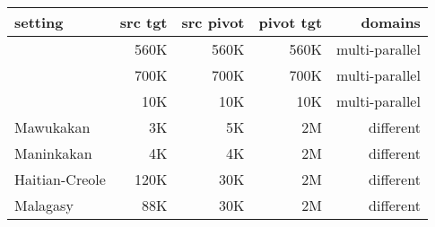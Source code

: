 \begin{tabular}{lrrrr}
\toprule
setting & src tgt & src pivot & pivot tgt & domains\\
\toprule
~\cite{Utiyama:07} & 560K & 560K & 560K & multi-parallel\\
~\cite{Cohn:07} & 700K & 700K & 700K & multi-parallel\\
~\cite{Cohn:07} & 10K & 10K & 10K & multi-parallel\\
\midrule
Mawukakan & 3K & 5K & 2M & different\\
Maninkakan & 4K & 4K & 2M  & different \\ 
Haitian-Creole & 120K & 30K & 2M & different\\
Malagasy & 88K & 30K & 2M & different\\
\bottomrule
\end{tabular}
 